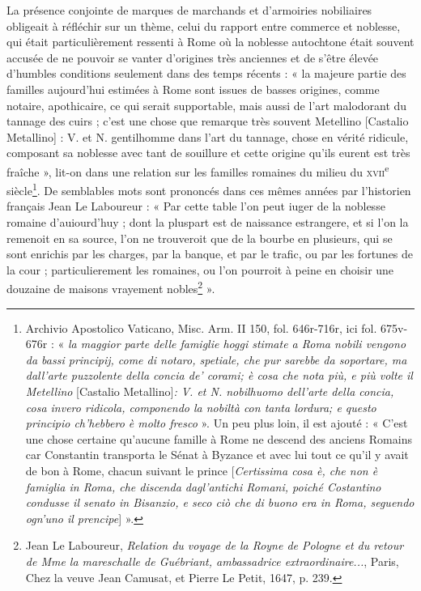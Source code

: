 \documentclass[12pt,twoside,openany]{book}
\begin{document}
La présence conjointe de marques de marchands et d’armoiries nobiliaires obligeait à réfléchir sur un thème, celui du rapport entre commerce et noblesse, qui était particulièrement ressenti à Rome où la noblesse autochtone était souvent accusée de ne pouvoir se vanter d’origines très anciennes et de s’être élevée d’humbles conditions seulement dans des temps récents : « la majeure partie des familles aujourd’hui estimées à Rome sont issues de basses origines, comme notaire, apothicaire, ce qui serait supportable, mais aussi de l’art malodorant du tannage des cuirs ; c’est une chose que remarque très souvent Metellino [Castalio Metallino] : V. et N. gentilhomme dans l’art du tannage, chose en vérité ridicule, composant sa noblesse avec tant de souillure et cette origine qu’ils eurent est très fraîche », lit-on dans une relation sur les familles romaines du milieu du \textsc{xvii}\textsuperscript{e} siècle\footnote{Archivio Apostolico Vaticano, Misc. Arm. II 150, fol. 646r-716r, ici fol. 675v-676r : « \textit{la maggior parte delle famiglie hoggi stimate a Roma nobili vengono da bassi principij, come di notaro, spetiale, che pur sarebbe da soportare, ma dall’arte puzzolente della concia de’ corami; è cosa che nota più, e più volte il Metellino }[Castalio Metallino]\textit{: V. et N. nobilhuomo dell’arte della concia, cosa invero ridicola, componendo la nobiltà con tanta lordura; e questo principio ch’hebbero è molto fresco} ». Un peu plus loin, il est ajouté : « C’est une chose certaine qu’aucune famille à Rome ne descend des anciens Romains car Constantin transporta le Sénat à Byzance et avec lui tout ce qu’il y avait de bon à Rome, chacun suivant le prince [\textit{Certissima cosa è, che non è famiglia in Roma, che discenda dagl’antichi Romani, poiché Costantino condusse il senato in Bisanzio, e seco ciò che di buono era in Roma, seguendo ogn’uno il prencipe}] ».}. De semblables mots sont prononcés dans ces mêmes années par l’historien français Jean Le Laboureur : « Par cette table l’on peut iuger de la noblesse romaine d’auiourd’huy ; dont la pluspart est de naissance estrangere, et si l’on la remenoit en sa source, l’on ne trouveroit que de la bourbe en plusieurs, qui se sont enrichis par les charges, par la banque, et par le trafic, ou par les fortunes de la cour ; particulierement les romaines, ou l’on pourroit à peine en choisir une douzaine de maisons vrayement nobles\footnote{Jean Le Laboureur, \textit{Relation du voyage de la Royne de Pologne et du retour de Mme la mareschalle de Guébriant, ambassadrice extraordinaire...}, Paris, Chez la veuve Jean Camusat, et Pierre Le Petit, 1647, p. 239.} ».
\end{document}
